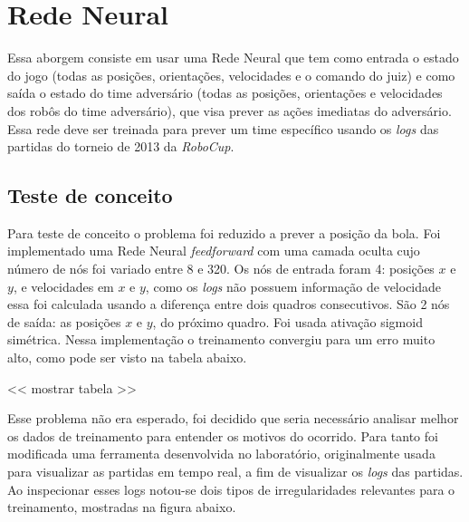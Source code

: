 \section{Rede Neural}\label{cap:abordagem_rede_neural}

Essa aborgem consiste em usar uma Rede Neural que tem como entrada o estado do
jogo (todas as posições, orientações, velocidades e o comando do juiz) e como
saída o estado do time adversário (todas as posições, orientações e velocidades
dos robôs do time adversário), que visa prever as ações imediatas do adversário.
Essa rede deve ser treinada para prever um time específico usando os
\textit{logs} das partidas do torneio de 2013 da \textit{RoboCup}.

\subsection{Teste de conceito}

Para teste de conceito o problema foi reduzido a prever a posição da bola. Foi
implementado uma Rede Neural \textit{feedforward} com uma camada oculta cujo
número de nós foi variado entre 8 e 320. Os nós de entrada foram 4: posições $x$
e $y$, e velocidades em $x$ e $y$, como os \textit{logs} não possuem informação
de velocidade essa foi calculada usando a diferença entre dois quadros
consecutivos. São 2 nós de saída: as posições $x$ e $y$, do próximo quadro. Foi
usada ativação sigmoid simétrica. Nessa implementação o treinamento convergiu
para um erro muito alto, como pode ser visto na tabela abaixo. %

<< mostrar tabela >>

Esse problema não era esperado, foi decidido que seria necessário analisar
melhor os dados de treinamento para entender os motivos do ocorrido. Para tanto
foi modificada uma ferramenta desenvolvida no laboratório, originalmente usada
para visualizar as partidas em tempo real, a fim de visualizar os \textit{logs}
das partidas. Ao inspecionar esses logs notou-se dois tipos de irregularidades
relevantes para o treinamento, mostradas na figura abaixo. %

